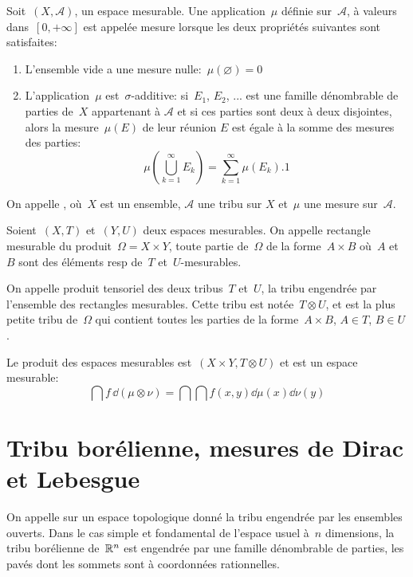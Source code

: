 \begin{definition}[Mesure]
\medskip
Soit~$(X,\mathcal{A})$, un espace mesurable.
Une application~$\mu$ définie sur~$\mathcal{A}$, à valeurs dans~$[0,+\infty]$ est appelée
mesure lorsque les deux propriétés suivantes sont satisfaites:
\begin{enumerate}
  \item L'ensemble vide a une mesure nulle:~$\mu\left(\varnothing\right)=0$
  \item L'application~$\mu$ est~$\sigma$-additive:
si~$E_1$, $E_2$, ... est une famille dénombrable de parties de~$X$ appartenant à
$\mathcal{A}$ et si ces parties sont deux à deux disjointes, alors la mesure~$\mu(E)$ de leur réunion
$E$ est égale à la somme des mesures des parties:
\begin{equation}
\mu\left(\bigcup_{k=1}^{\infty}E_{k}\right)=\sum_{k=1}^{\infty}\mu(E_{k}).1
\end{equation}
\end{enumerate}
\end{definition}

On appelle ,
 où~$X$ est un ensemble, $\mathcal{A}$ une tribu sur
$X$ et~$\mu$ une mesure sur~$\mathcal{A}$.

\medskip
{}
Soient~$(X,T)$ et~$(Y,U)$ deux espaces mesurables.
On appelle rectangle mesurable du produit~$\Omega=X\times Y$, toute partie de~$\Omega$ de la forme~$A\times B$ où~$A$ et~$B$ sont des éléments resp de~$T$ et~$U$-mesurables.

On appelle produit tensoriel des deux tribus~$T$ et~$U$, la tribu engendrée par l'ensemble des rectangles mesurables.
Cette tribu est notée~$T \otimes U$, et est la plus petite tribu de~$\Omega$ qui contient toutes les parties de la forme~$A\times B$, $A\in T$, $B\in U$.

Le produit des espaces mesurables est~$(X\times Y, T \otimes U)$ et est un espace mesurable:
\begin{equation}
\dint f\,\dd(\mu \otimes \nu) = \dint\dint f(x,y) \dd\mu(x)\dd\nu(y)
\end{equation}

\medskip
\section{Tribu borélienne, mesures de Dirac et Lebesgue}

\begin{definition}
On appelle  sur un espace topologique donné la tribu engendrée par les ensembles ouverts.
Dans le cas simple et fondamental de l'espace usuel à~$n$ dimensions, la tribu borélienne de~$\mathbb R^n$ est engendrée par une famille dénombrable de parties, les pavés dont les sommets sont à coordonnées rationnelles.
\end{definition}

